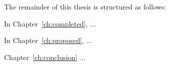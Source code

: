 The remainder of this thesis is structured as follows:


In Chapter~\ref{ch:completed}, ...

In Chapter~\ref{ch:proposed}, ...

Chapter~\ref{ch:conclusion} ...





